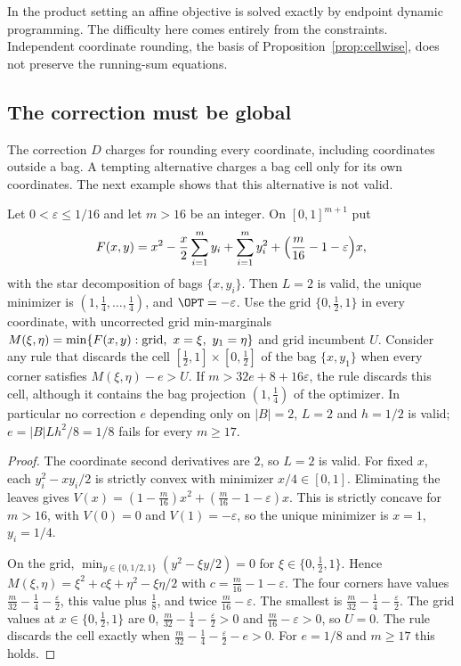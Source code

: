 In the product setting an affine objective is solved exactly by endpoint
dynamic programming. The difficulty here comes entirely from the
constraints. Independent coordinate rounding, the basis of
Proposition~\ref{prop:cellwise}, does not preserve the running-sum equations.

\subsection{The correction must be global}\label{sec:limits-star}

The correction $D$ charges for rounding every coordinate, including
coordinates outside a bag. A tempting alternative charges a bag cell only for
its own coordinates. The next example shows that this alternative is not
valid.

\begin{proposition}\label{lim:prop:star}
Let $0<\varepsilon\le1/16$ and let $m>16$ be an integer. On $[0,1]^{m+1}$
put
\[
F(x,y)=x^2-\frac x2\sum_{i=1}^my_i+\sum_{i=1}^my_i^2
+\Bigl(\frac m{16}-1-\varepsilon\Bigr)x,
\]
with the star decomposition of bags $\{x,y_i\}$. Then $L=2$ is valid, the
unique minimizer is $(1,\tfrac14,\ldots,\tfrac14)$, and $\OPT=-\varepsilon$.
Use the grid $\{0,\tfrac12,1\}$ in every coordinate, with uncorrected grid
min-marginals
$M(\xi,\eta)=\min\{F(x,y):\hbox{grid},\ x=\xi,\ y_1=\eta\}$ and grid
incumbent $U$. Consider any rule that discards the cell
$[\tfrac12,1]\times[0,\tfrac12]$ of the bag $\{x,y_1\}$ when every corner
satisfies $M(\xi,\eta)-e>U$. If $m>32e+8+16\varepsilon$, the rule discards
this cell, although it contains the bag projection $(1,\tfrac14)$ of the
optimizer. In particular no correction $e$ depending only on $|B|=2$,
$L=2$ and $h=1/2$ is valid; $e=|B|Lh^2/8=1/8$ fails for every $m\ge17$.
\end{proposition}

\begin{proof}
The coordinate second derivatives are $2$, so $L=2$ is valid. For fixed $x$,
each $y_i^2-xy_i/2$ is strictly convex with minimizer $x/4\in[0,1]$.
Eliminating the leaves gives $V(x)=(1-\frac m{16})x^2+(\frac m{16}-1-
\varepsilon)x$. This is strictly concave for $m>16$, with $V(0)=0$ and
$V(1)=-\varepsilon$, so the unique minimizer is $x=1$, $y_i=1/4$.

On the grid, $\min_{y\in\{0,1/2,1\}}(y^2-\xi y/2)=0$ for $\xi\in\{0,\tfrac12,
1\}$. Hence $M(\xi,\eta)=\xi^2+c\xi+\eta^2-\xi\eta/2$ with
$c=\frac m{16}-1-\varepsilon$. The four corners have values
$\frac m{32}-\frac14-\frac\varepsilon2$, this value plus $\frac18$, and twice
$\frac m{16}-\varepsilon$. The smallest is
$\frac m{32}-\frac14-\frac\varepsilon2$. The grid values at
$x\in\{0,\tfrac12,1\}$ are $0$,
$\frac m{32}-\frac14-\frac\varepsilon2>0$ and $\frac m{16}-\varepsilon>0$,
so $U=0$. The rule discards the cell exactly when
$\frac m{32}-\frac14-\frac\varepsilon2-e>0$. For $e=1/8$ and $m\ge17$ this
holds.
\end{proof}

